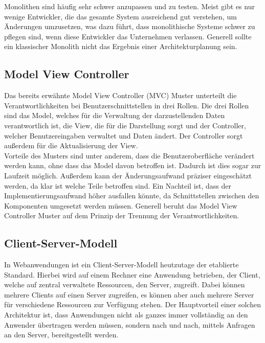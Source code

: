Monolithen sind häufig sehr schwer anzupassen und zu testen.
Meist gibt es nur wenige Entwickler, die das gesamte System ausreichend gut verstehen, um Änderungen umzusetzen, was dazu führt, dass monolithische Systeme schwer zu pflegen sind, wenn diese Entwickler das Unternehmen verlassen.
Generell sollte ein klassischer Monolith nicht das Ergebnis einer Architekturplanung sein.~\cite{softArchGrundl}

\subsection{Model View Controller} %
\label{sub:Model_View_Controller}
Das bereits erwähnte Model View Controller (MVC) Muster unterteilt die Verantwortlichkeiten bei Benutzerschnittstellen in drei Rollen.
Die drei Rollen sind das Model, welches für die Verwaltung der darzustellenden Daten verantwortlich ist, die View, die für die Darstellung sorgt und der Controller, welcher Benutzereingaben verwaltet und Daten ändert.
Der Controller sorgt außerdem für die Aktualisierung der View.\\
Vorteile des Musters sind unter anderem, dass die Benutzeroberfläche verändert werden kann, ohne dass das Model davon betroffen ist.
Dadurch ist dies sogar zur Laufzeit möglich.
Außerdem kann der Änderungsaufwand präziser eingeschätzt werden, da klar ist welche Teile betroffen sind.
Ein Nachteil ist, dass der Implementierungsaufwand höher ausfallen könnte, da Schnittstellen zwischen den Komponenten umgesetzt werden müssen.
Generell beruht das Model View Controller Muster auf dem Prinzip der Trennung der Verantwortlichkeiten.~\cite{eilebrecht2018patterns}

\subsection{Client-Server-Modell} %
\label{sub:Client_Server_Modell}
In Webanwendungen ist ein Client-Server-Modell heutzutage der etablierte Standard.
Hierbei wird auf einem Rechner eine Anwendung betrieben, der Client, welche auf zentral verwaltete Ressourcen, den Server, zugreift.
Dabei können mehrere Clients auf einen Server zugreifen, es können aber auch mehrere Server für verschiedene Ressourcen zur Verfügung stehen.
Der Hauptvorteil einer solchen Architektur ist, dass Anwendungen nicht als ganzes immer vollständig an den Anwender übertragen werden müssen, sondern nach und nach, mittels Anfragen an den Server, bereitgestellt werden.~\cite{softArchGrundl}\\

